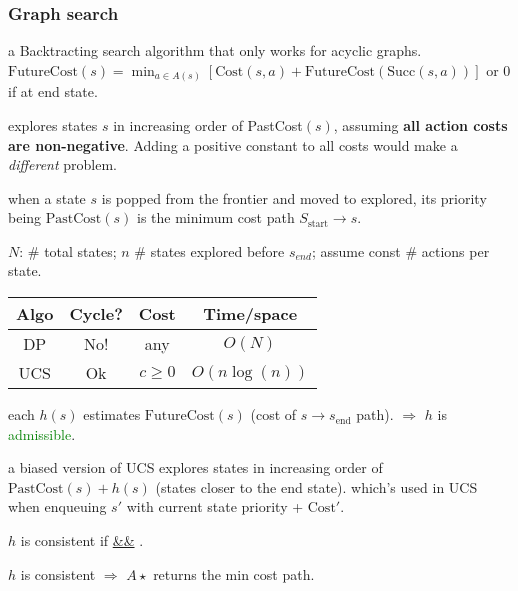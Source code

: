 \subsubsection{Graph search}

 a Backtracting search algorithm that only works
for acyclic graphs.
$\text{FutureCost}(s) = \min_{a\in A(s)}\left[\text{Cost}(s,a) + \text{FutureCost}(\text{Succ}(s,a))\right]$
or $0$ if at end state.

 explores states $s$ in increasing order of
PastCost$(s)$, assuming \textbf{all action costs are non-negative}. Adding a
positive constant to all costs would make a \emph{different} problem.

 when a state $s$ is popped from the frontier and moved
to explored, its priority being $\text{PastCost}(s)$ is the minimum cost path
$S_\text{start} \rightarrow s$.

 $N$: \# total states; $n$ \# states explored before $s_{end}$;
assume const \# actions per state.

\begin{tabular}{|c|c|c|c|} 
    \hline
    \textbf{Algo} & \textbf{Cycle?} & \textbf{Cost} & \textbf{Time/space} \\
    \hline
    DP & No! & any & $O(N)$ \\ 
    \hline
    UCS & Ok & $c \ge 0$ & $O(n \log(n))$ \\
    \hline
\end{tabular}

 each $h(s)$ estimates $\text{FutureCost}(s)$ (cost of $s
\rightarrow s_{\text{end}}$ path).  $\Rightarrow$
$h$ is \textcolor{Green}{admissible}.

 a biased version of UCS explores states in increasing
order of $\text{PastCost}(s) + h(s)$ (states closer to the end state).
which's used in UCS when enqueuing $s'$ with current state priority +
$\text{Cost}'$.

 $h$ is consistent if
 \underline{\&\&}
.
 

 $h$ is consistent $\Rightarrow$ $A\star$ returns the min cost path.

